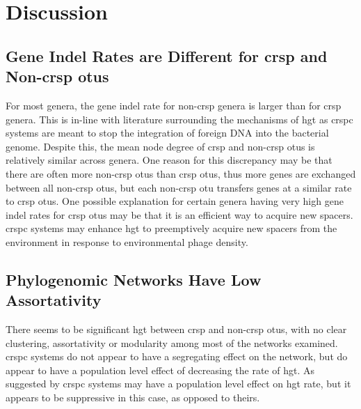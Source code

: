 \section{Discussion}
\subsection{Gene Indel Rates are Different for \ac{crsp} and Non-\ac{crsp} \ac{otu}s}
For most genera, the gene indel rate for non-\ac{crsp} genera is larger than for \ac{crsp} genera.
This is in-line with literature surrounding the mechanisms of \ac{hgt} as \ac{crspc} systems are meant to stop the integration of foreign DNA into the bacterial genome.
Despite this, the mean node degree of \ac{crsp} and non-\ac{crsp} \ac{otu}s is relatively similar across genera.
One reason for this discrepancy may be that there are often more non-\ac{crsp} \ac{otu}s than \ac{crsp} \ac{otu}s, thus more genes are exchanged between all non-\ac{crsp} \ac{otu}s, but each non-\ac{crsp} \ac{otu} transfers genes at a similar rate to \ac{crsp} \ac{otu}s.
One possible explanation for certain genera having very high gene indel rates for \ac{crsp} \ac{otu}s may be that it is an efficient way to acquire new spacers.
\ac{crspc} systems may enhance \ac{hgt} to preemptively acquire new spacers from the environment in response to environmental phage density.
\subsection{Phylogenomic Networks Have Low Assortativity}
There seems to be significant \ac{hgt} between \ac{crsp} and non-\ac{crsp} \ac{otu}s, with no clear clustering, assortativity or modularity among most of the networks examined.
\ac{crspc} systems do not appear to have a segregating effect on the network, but do appear to have a population level effect of decreasing the rate  of \ac{hgt}.
As suggested by \citep{transhgt} \ac{crspc} systems may have a population level effect on \ac{hgt} rate, but it appears to be suppressive in this case, as opposed to theirs.
